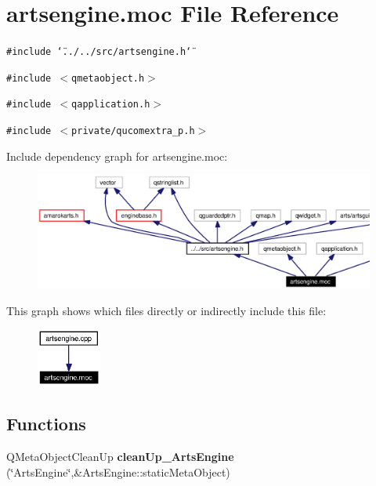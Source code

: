 \section{artsengine.moc File Reference}
\label{artsengine_8moc}


{\tt \#include \char`\"{}../../src/artsengine.h\char`\"{}}\par
{\tt \#include $<$qmetaobject.h$>$}\par
{\tt \#include $<$qapplication.h$>$}\par
{\tt \#include $<$private/qucomextra\_\-p.h$>$}\par


Include dependency graph for artsengine.moc:\begin{figure}[H]
\begin{center}
\leavevmode
\includegraphics[width=364pt]{artsengine_8moc__incl}
\end{center}
\end{figure}


This graph shows which files directly or indirectly include this file:\begin{figure}[H]
\begin{center}
\leavevmode
\includegraphics[width=60pt]{artsengine_8moc__dep__incl}
\end{center}
\end{figure}
\subsection*{Functions}
\begin{CompactItemize}
\item 
QMeta\-Object\-Clean\-Up {\bf clean\-Up\_\-Arts\-Engine} (\char`\"{}Arts\-Engine\char`\"{},\&Arts\-Engine::static\-Meta\-Object)
\end{CompactItemize}


